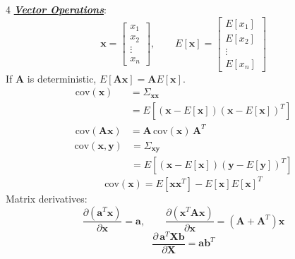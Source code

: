 \documentclass[12pt]{article}
\newcommand{\bulletPoint}[1]{\ul{\textit{\textbf{#1}}}}
\begin{document}
\begin{multicols*}{4}
\bulletPoint{Vector Operations}:
\useshortskip \begin{equation*}
    \mathbf{x}=\begin{bmatrix}x_1\\x_2\\ \vdots \\x_n\end{bmatrix},\qquad
    E[\mathbf{x}]=\begin{bmatrix}E[x_1]\\E[x_2]\\ \vdots \\E[x_n]\end{bmatrix}
\end{equation*}
If $\mathbf{A}$ is deterministic, $E[\mathbf{A}\mathbf{x}]=\mathbf{A}E[\mathbf{x}]$.
\useshortskip \begin{equation*}
    \begin{split}
        \mathrm{cov}(\mathbf{x}) &= \Sigma_{\mathbf{x}\mathbf{x}} \\
        &= E\!\left[(\mathbf{x}-E[\mathbf{x}])(\mathbf{x}-E[\mathbf{x}])^T\right] \\
        \mathrm{cov}(\mathbf{A}\mathbf{x}) &= \mathbf{A}\,\mathrm{cov}(\mathbf{x})\,\mathbf{A}^T
    \end{split}
\end{equation*}
\useshortskip \begin{equation*}
    \begin{split}
        \mathrm{cov}(\mathbf{x},\mathbf{y}) &= \Sigma_{\mathbf{x}\mathbf{y}} \\
        &= E\!\left[(\mathbf{x}-E[\mathbf{x}])(\mathbf{y}-E[\mathbf{y}])^T\right]
    \end{split}
\end{equation*}
\useshortskip \begin{equation*}
    \mathrm{cov}(\mathbf{x})=E[\mathbf{x}\mathbf{x}^T]-E[\mathbf{x}]E[\mathbf{x}]^T
\end{equation*}
Matrix derivatives:
\useshortskip \begin{equation*}
    \frac{\partial(\mathbf{a}^T\mathbf{x})}{\partial \mathbf{x}}=\mathbf{a},\qquad
    \frac{\partial(\mathbf{x}^T\mathbf{A}\mathbf{x})}{\partial \mathbf{x}}=
    (\mathbf{A}+\mathbf{A}^T)\mathbf{x}
\end{equation*}
\useshortskip \begin{equation*}
    \frac{\partial\,\mathbf{a}^T\mathbf{X}\mathbf{b}}{\partial \mathbf{X}}
    =\mathbf{a}\mathbf{b}^T
\end{equation*}

\end{multicols*}
\end{document}
